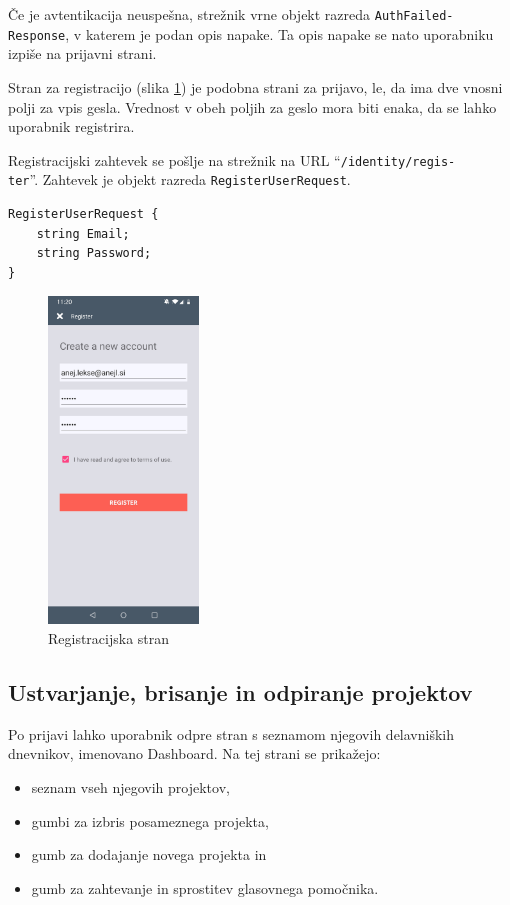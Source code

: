\documentclass[a4paper, 12pt]{book}
\begin{document}
Če je avtentikacija neuspešna, strežnik vrne objekt razreda \texttt{AuthFailed-\\Response}, v katerem je podan opis napake.
Ta opis napake se nato uporabniku izpiše na prijavni strani.

Stran za registracijo (slika \ref{app_register}) je podobna strani za prijavo, le, da ima dve vnosni polji za vpis gesla.
Vrednost v obeh poljih za geslo mora biti enaka, da se lahko uporabnik registrira.

Registracijski zahtevek se pošlje na strežnik na URL \enquote{\texttt{/identity/regis-\\ter}}.
Zahtevek je objekt razreda \texttt{RegisterUserRequest}.

\begin{Verbatim}[commandchars=+\[\]]
RegisterUserRequest {
    string Email; 
    string Password;
}
\end{Verbatim}

\begin{figure}[H]
\begin{center}
\includegraphics[width=4cm]{app_register}
\end{center}
	\caption{Registracijska stran}
\label{app_register}
\end{figure}

\subsection{Ustvarjanje, brisanje in odpiranje projektov}

Po prijavi lahko uporabnik odpre stran s seznamom njegovih delavniških dnevnikov, imenovano Dashboard.
Na tej strani se prikažejo:
\begin{itemize}
	\item seznam vseh njegovih projektov, 
	\item gumbi za izbris posameznega projekta,
	\item gumb za dodajanje novega projekta in
	\item gumb za zahtevanje in sprostitev glasovnega pomočnika.
\end{itemize}
\end{document}
